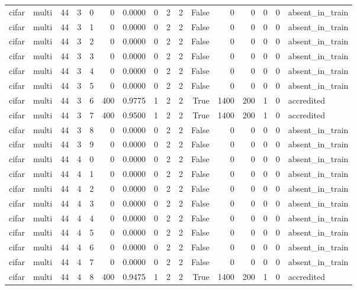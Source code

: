 \begin{tabular}{llrrrrrrrrrrrrrl}
cifar & multi & 44 & 3 & 0 & 0 & 0.0000 & 0 & 2 & 2 & False & 0 & 0 & 0 & 0 & absent\_in\_train \\
cifar & multi & 44 & 3 & 1 & 0 & 0.0000 & 0 & 2 & 2 & False & 0 & 0 & 0 & 0 & absent\_in\_train \\
cifar & multi & 44 & 3 & 2 & 0 & 0.0000 & 0 & 2 & 2 & False & 0 & 0 & 0 & 0 & absent\_in\_train \\
cifar & multi & 44 & 3 & 3 & 0 & 0.0000 & 0 & 2 & 2 & False & 0 & 0 & 0 & 0 & absent\_in\_train \\
cifar & multi & 44 & 3 & 4 & 0 & 0.0000 & 0 & 2 & 2 & False & 0 & 0 & 0 & 0 & absent\_in\_train \\
cifar & multi & 44 & 3 & 5 & 0 & 0.0000 & 0 & 2 & 2 & False & 0 & 0 & 0 & 0 & absent\_in\_train \\
cifar & multi & 44 & 3 & 6 & 400 & 0.9775 & 1 & 2 & 2 & True & 1400 & 200 & 1 & 0 & accredited \\
cifar & multi & 44 & 3 & 7 & 400 & 0.9500 & 1 & 2 & 2 & True & 1400 & 200 & 1 & 0 & accredited \\
cifar & multi & 44 & 3 & 8 & 0 & 0.0000 & 0 & 2 & 2 & False & 0 & 0 & 0 & 0 & absent\_in\_train \\
cifar & multi & 44 & 3 & 9 & 0 & 0.0000 & 0 & 2 & 2 & False & 0 & 0 & 0 & 0 & absent\_in\_train \\
cifar & multi & 44 & 4 & 0 & 0 & 0.0000 & 0 & 2 & 2 & False & 0 & 0 & 0 & 0 & absent\_in\_train \\
cifar & multi & 44 & 4 & 1 & 0 & 0.0000 & 0 & 2 & 2 & False & 0 & 0 & 0 & 0 & absent\_in\_train \\
cifar & multi & 44 & 4 & 2 & 0 & 0.0000 & 0 & 2 & 2 & False & 0 & 0 & 0 & 0 & absent\_in\_train \\
cifar & multi & 44 & 4 & 3 & 0 & 0.0000 & 0 & 2 & 2 & False & 0 & 0 & 0 & 0 & absent\_in\_train \\
cifar & multi & 44 & 4 & 4 & 0 & 0.0000 & 0 & 2 & 2 & False & 0 & 0 & 0 & 0 & absent\_in\_train \\
cifar & multi & 44 & 4 & 5 & 0 & 0.0000 & 0 & 2 & 2 & False & 0 & 0 & 0 & 0 & absent\_in\_train \\
cifar & multi & 44 & 4 & 6 & 0 & 0.0000 & 0 & 2 & 2 & False & 0 & 0 & 0 & 0 & absent\_in\_train \\
cifar & multi & 44 & 4 & 7 & 0 & 0.0000 & 0 & 2 & 2 & False & 0 & 0 & 0 & 0 & absent\_in\_train \\
cifar & multi & 44 & 4 & 8 & 400 & 0.9475 & 1 & 2 & 2 & True & 1400 & 200 & 1 & 0 & accredited \\

\end{tabular}
